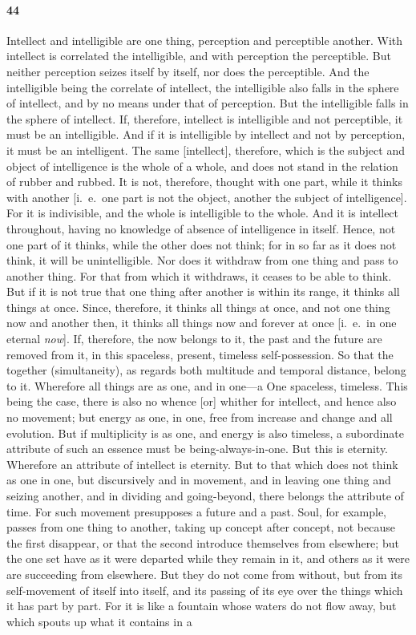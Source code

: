 \documentclass{article}
\begin{document}
\paragraph{44} Intellect and intelligible are one thing, perception and perceptible another. With intellect is correlated the intelligible, and with perception the perceptible. But neither perception seizes itself by itself, nor does the perceptible. And the intelligible being the correlate of intellect, the intelligible also falls in the sphere of intellect, and by no means under that of perception. But the intelligible falls in the sphere of intellect. If, therefore, intellect is intelligible and not perceptible, it must be an intelligible. And if it is intelligible by intellect and not by perception, it must be an intelligent. The same [intellect], therefore, which is the subject and object of intelligence is the whole of a whole, and does not stand in the relation of rubber and rubbed. It is not, therefore, thought with one part, while it thinks with another [i.~e.~one part is not the object, another the subject of intelligence]. For it is indivisible, and the whole is intelligible to the whole. And it is intellect throughout, having no knowledge of absence of intelligence in itself. Hence, not one part of it thinks, while the other does not think; for in so far as it does not think, it will be unintelligible. Nor does it withdraw from one thing and pass to another thing. For that from which it withdraws, it ceases to be able to think. But if it is not true that one thing after another is within its range, it thinks all things at once. Since, therefore, it thinks all things at once, and not one thing now and another then, it thinks all things now and forever at once [i.~e.~in one eternal \textit{now}]. If, therefore, the now belongs to it, the past and the future are removed from it, in this spaceless, present, timeless self-possession. So that the together (simultaneity), as regards both multitude and temporal distance, belong to it. Wherefore all things are as one, and in one---a One spaceless, timeless. This being the case, there is also no whence [or] whither for intellect, and hence also no movement; but energy as one, in one, free from increase and change and all evolution. But if multiplicity is as one, and energy is also timeless, a subordinate attribute of such an essence must be being-always-in-one. But this is eternity. Wherefore an attribute of intellect is eternity. But to that which does not think as one in one, but discursively and in movement, and in leaving one thing and seizing another, and in dividing and going-beyond, there belongs the attribute of time. For such movement presupposes a future and a past. Soul, for example, passes from one thing to another, taking up concept after concept, not because the first disappear, or that the second introduce themselves from elsewhere; but the one set have as it were departed while they remain in it, and others as it were are succeeding from elsewhere. But they do not come from without, but from its self-movement of itself into itself, and its passing of its eye over the things which it has part by part. For it is like a fountain whose waters do not flow away, but which spouts up what it contains in a 
\end{document}
